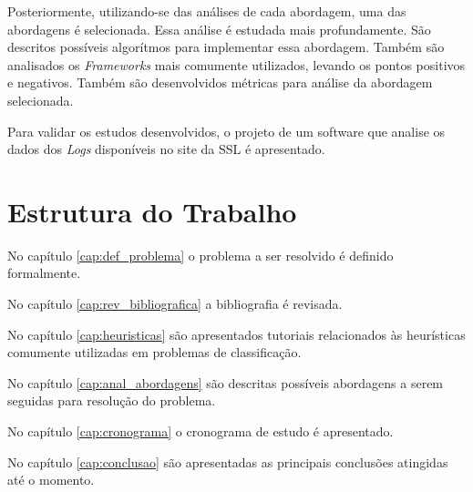 Posteriormente, utilizando-se das análises de cada abordagem, uma das abordagens
é selecionada. Essa análise é estudada mais profundamente. São descritos possíveis 
algorítmos para implementar essa abordagem. Também são analisados os 
\textit{Frameworks} mais comumente utilizados, levando os pontos positivos e 
negativos. Também são desenvolvidos métricas para análise da abordagem selecionada.

Para validar os estudos desenvolvidos, o projeto de um software
que analise os dados dos \textit{Logs} disponíveis no site da SSL é apresentado.

\section{Estrutura do Trabalho}

No capítulo \ref{cap:def_problema} o problema a ser resolvido é definido formalmente.

No capítulo \ref{cap:rev_bibliografica} a bibliografia é revisada.

No capítulo \ref{cap:heuristicas} são apresentados tutoriais relacionados às 
heurísticas comumente utilizadas em problemas de classificação.

No capítulo \ref{cap:anal_abordagens} são descritas possíveis abordagens a serem
seguidas para resolução do problema.

No capítulo \ref{cap:cronograma} o cronograma de estudo é apresentado.

No capítulo \ref{cap:conclusao} são apresentadas as principais conclusões atingidas
até o momento.